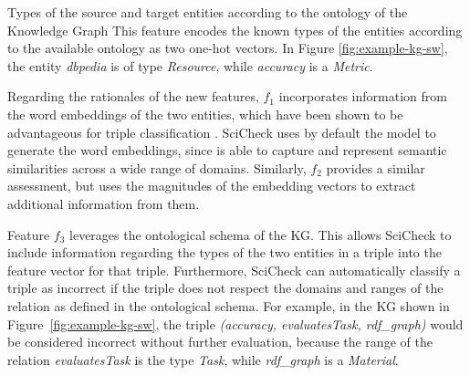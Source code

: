 \scifeature
{Types of the source and target entities according to the ontology of the Knowledge Graph}
{This feature encodes the known types of the entities according to the available ontology as two one-hot vectors. In Figure \ref{fig:example-kg-sw}, the entity \textit{dbpedia} is of type \textit{Resource}, while \textit{accuracy} is a \textit{Metric}.}




Regarding the rationales of the new features, $f_1$ incorporates information from the word embeddings of the two entities, which have been shown to be advantageous for triple classification \cite{sun2019, kazemi2018}. SciCheck uses by default the \roberta{} model \cite{liu2019roberta} to generate the word embeddings, since is able to capture and represent semantic similarities across a wide range of domains. Similarly, $f_2$ provides a similar assessment, but uses the magnitudes of the embedding vectors to extract additional information from them.

Feature $f_3$ leverages the ontological schema of the KG. This allows SciCheck to include information regarding the types of the two entities in a triple into the feature vector for that triple. Furthermore, SciCheck can automatically classify a triple as incorrect if the triple does not respect the domains and ranges of the relation as defined in the ontological schema. For example, in the KG shown in Figure~\ref{fig:example-kg-sw}, the triple \textit{(accuracy, evaluatesTask, rdf\_graph)} would be considered incorrect without further evaluation, because the range of the relation \textit{evaluatesTask} is the type \textit{Task}, while \textit{rdf\_graph} is a \textit{Material}. 

